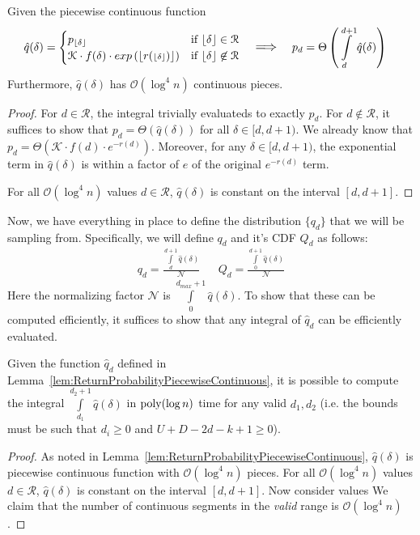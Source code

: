 \begin{lemma}
\label{lem:ReturnProbabilityPiecewiseContinuous}
Given the piecewise continuous function
{\large
    \begin{align*}
        \hat q(\delta) &=
        \begin{cases}
            p_{\floor\delta} &\mbox{if } \floor\delta \in \mathcal R \\ 
            \mathcal K\cdot f(\delta)\cdot exp\left(\lfloor{r({\scriptstyle\floor\delta})}\rfloor\right) & \mbox{if } \floor\delta \not\in \mathcal R
        \end{cases}
        && \mathlarger \implies
        && p_d = \Theta\left( \int\limits_d^{d+1} \hat q(\delta)\right)
    \end{align*}
}
Furthermore, $\hat q(\delta)$ has $\mathcal O(\log^4 n)$ continuous pieces.
\end{lemma}
\begin{proof}
For $d \in \mathcal R$, the integral trivially evaluateds to exactly $p_d$.
For $d\not\in \mathcal R$, it suffices to show that $p_d = \Theta\left( \hat q(\delta)\right)$ for all $\delta\in [d,d+1)$.
We already know that $p_d = \Theta\left( \mathcal K\cdot f(d)\cdot e^{-r(d)}\right)$.
Moreover, for any $\delta\in [d,d+1)$, the exponential term in $\hat q(\delta)$ is within a factor of $e$ of the original $e^{-r(d)}$ term.

For all $\mathcal O(\log^4 n)$ values $d\in \mathcal R$, $\hat q(\delta)$ is constant on the interval $[d,d+1]$.
\end{proof}

Now, we have everything in place to define the distribution $\{ q_d\}$ that we will be sampling from.
Specifically, we will define $q_d$ and it's CDF $Q_d$ as follows:
\begin{align}
    q_d = \frac{\int\limits_d^{d+1} \hat q(\delta)}{\mathcal N}
    && Q_d = \frac{\int\limits_0^{d+1} \hat q(\delta)}{\mathcal N}
\end{align}
Here the normalizing factor $\mathcal N$ is $\int\limits_0^{d_{max}+1} \hat q(\delta)$.
To show that these can be computed efficiently, it suffices to show that any integral of $\hat q_d$ can be efficiently evaluated.

\begin{lemma}
\label{lem:ReturnProbabilityPiecewiseContinuousIntegral}
Given the function $\hat q_d$ defined in Lemma~\ref{lem:ReturnProbabilityPiecewiseContinuous},
it is possible to compute the integral $\int\limits_{d_1}^{d_2+1} \hat q(\delta)$ in $\mathrm{poly}(\log n)$ time for any valid $d_1, d_2$
(i.e. the bounds must be such that $d_i \ge 0$ and $U+D-2d-k+1 \ge 0$).
\end{lemma}
\begin{proof}
As noted in Lemma~\ref{lem:ReturnProbabilityPiecewiseContinuous}, $\hat q(\delta)$ is piecewise continuous function with $\mathcal O(\log^4 n)$ pieces.
For all $\mathcal O(\log^4 n)$ values $d\in \mathcal R$, $\hat q(\delta)$ is constant on the interval $[d,d+1]$.
Now consider values
We claim that the number of continuous segments in the \emph{valid} range is $\mathcal O(\log^4 n)$.
\end{proof}

